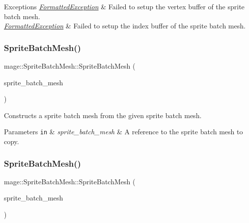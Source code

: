\begin{DoxyExceptions}{Exceptions}
{\em \hyperlink{structmage_1_1_formatted_exception}{Formatted\+Exception}} & Failed to setup the vertex buffer of the sprite batch mesh. \\
\hline
{\em \hyperlink{structmage_1_1_formatted_exception}{Formatted\+Exception}} & Failed to setup the index buffer of the sprite batch mesh. \\
\hline
\end{DoxyExceptions}
\hypertarget{classmage_1_1_sprite_batch_mesh_af86adf72834bd4a8b5b55af3e91bd339}{}\label{classmage_1_1_sprite_batch_mesh_af86adf72834bd4a8b5b55af3e91bd339} 
\subsubsection{\texorpdfstring{Sprite\+Batch\+Mesh()}{SpriteBatchMesh()}\hspace{0.1cm}{\footnotesize\ttfamily [2/3]}}
{\footnotesize\ttfamily mage\+::\+Sprite\+Batch\+Mesh\+::\+Sprite\+Batch\+Mesh (\begin{DoxyParamCaption}\item[{const \hyperlink{classmage_1_1_sprite_batch_mesh}{Sprite\+Batch\+Mesh} \&}]{sprite\+\_\+batch\+\_\+mesh }\end{DoxyParamCaption})\hspace{0.3cm}{\ttfamily [delete]}}

Constructs a sprite batch mesh from the given sprite batch mesh.


\begin{DoxyParams}[1]{Parameters}
\mbox{\tt in}  & {\em sprite\+\_\+batch\+\_\+mesh} & A reference to the sprite batch mesh to copy. \\
\hline
\end{DoxyParams}
\hypertarget{classmage_1_1_sprite_batch_mesh_ae577b9b1f38ab5748c35675135da1e3e}{}\label{classmage_1_1_sprite_batch_mesh_ae577b9b1f38ab5748c35675135da1e3e} 
\subsubsection{\texorpdfstring{Sprite\+Batch\+Mesh()}{SpriteBatchMesh()}\hspace{0.1cm}{\footnotesize\ttfamily [3/3]}}
{\footnotesize\ttfamily mage\+::\+Sprite\+Batch\+Mesh\+::\+Sprite\+Batch\+Mesh (\begin{DoxyParamCaption}\item[{\hyperlink{classmage_1_1_sprite_batch_mesh}{Sprite\+Batch\+Mesh} \&\&}]{sprite\+\_\+batch\+\_\+mesh }\end{DoxyParamCaption})\hspace{0.3cm}{\ttfamily [default]}}

